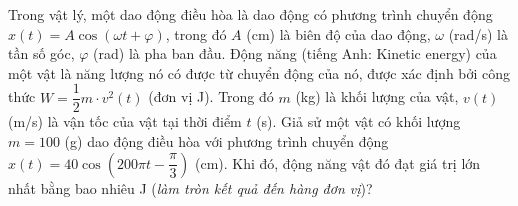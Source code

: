 \begin{bt}%
	Trong vật lý, một dao động điều hòa là dao động có phương trình chuyển động $x(t)=A\cos(\omega t+\varphi)$, trong đó $A$ (cm) là biên độ của dao động,  $\omega$ (rad/s) là tần số góc, $\varphi$ (rad) là pha ban đầu. Động năng (tiếng Anh: Kinetic energy) của một vật là năng lượng nó có được từ chuyển động của nó, được xác định bởi công thức $W=\dfrac{1}{2}m\cdot v^2(t)$ (đơn vị J). Trong đó $m$ (kg) là khối lượng của vật, $v(t)$ (m/s) là vận tốc của vật tại thời điểm $t$ (s). Giả sử một vật có khối lượng $m=100$ (g) dao động điều hòa với phương trình chuyển động $x(t)=40\cos\left(200\pi t-\dfrac{\pi}{3}\right)$ (cm). Khi đó, động năng vật đó đạt giá trị lớn nhất bằng bao nhiêu J (\textit{làm tròn kết quả đến hàng đơn vị})?
\end{bt}

